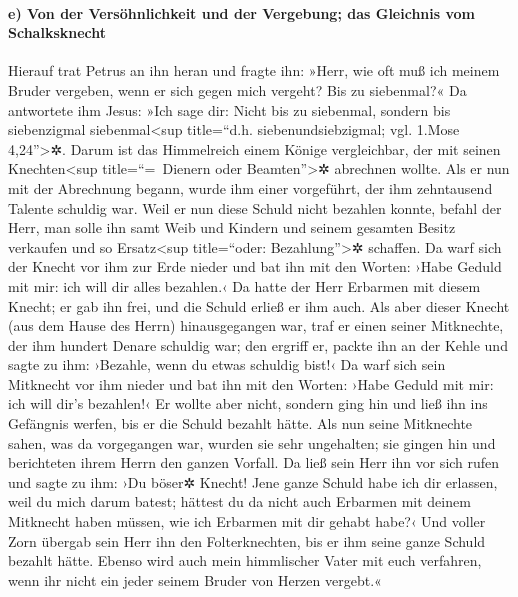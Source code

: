 \hypertarget{e-von-der-versuxf6hnlichkeit-und-der-vergebung-das-gleichnis-vom-schalksknecht}{%
\paragraph{e) Von der Versöhnlichkeit und der Vergebung; das Gleichnis
vom
Schalksknecht}\label{e-von-der-versuxf6hnlichkeit-und-der-vergebung-das-gleichnis-vom-schalksknecht}}

 Hierauf trat Petrus an ihn heran und fragte ihn: »Herr,
wie oft muß ich meinem Bruder vergeben, wenn er sich gegen mich vergeht?
Bis zu siebenmal?«  Da antwortete ihm Jesus: »Ich sage
dir: Nicht bis zu siebenmal, sondern bis siebenzigmal
siebenmal\textless sup title=``d.h. siebenundsiebzigmal; vgl. 1.Mose
4,24''\textgreater✲.  Darum ist das Himmelreich einem
Könige vergleichbar, der mit seinen Knechten\textless sup
title=``=~Dienern oder Beamten''\textgreater✲ abrechnen wollte.
 Als er nun mit der Abrechnung begann, wurde ihm einer
vorgeführt, der ihm zehntausend Talente schuldig war. 
Weil er nun diese Schuld nicht bezahlen konnte, befahl der Herr, man
solle ihn samt Weib und Kindern und seinem gesamten Besitz verkaufen und
so Ersatz\textless sup title=``oder: Bezahlung''\textgreater✲ schaffen.
 Da warf sich der Knecht vor ihm zur Erde nieder und bat
ihn mit den Worten: ›Habe Geduld mit mir: ich will dir alles bezahlen.‹
 Da hatte der Herr Erbarmen mit diesem Knecht; er gab ihn
frei, und die Schuld erließ er ihm auch.  Als aber dieser
Knecht (aus dem Hause des Herrn) hinausgegangen war, traf er einen
seiner Mitknechte, der ihm hundert Denare schuldig war; den ergriff er,
packte ihn an der Kehle und sagte zu ihm: ›Bezahle, wenn du etwas
schuldig bist!‹  Da warf sich sein Mitknecht vor ihm
nieder und bat ihn mit den Worten: ›Habe Geduld mit mir: ich will dir's
bezahlen!‹  Er wollte aber nicht, sondern ging hin und
ließ ihn ins Gefängnis werfen, bis er die Schuld bezahlt hätte.
 Als nun seine Mitknechte sahen, was da vorgegangen war,
wurden sie sehr ungehalten; sie gingen hin und berichteten ihrem Herrn
den ganzen Vorfall.  Da ließ sein Herr ihn vor sich rufen
und sagte zu ihm: ›Du böser✲ Knecht! Jene ganze Schuld habe ich dir
erlassen, weil du mich darum batest;  hättest du da nicht
auch Erbarmen mit deinem Mitknecht haben müssen, wie ich Erbarmen mit
dir gehabt habe?‹  Und voller Zorn übergab sein Herr ihn
den Folterknechten, bis er ihm seine ganze Schuld bezahlt hätte.
 Ebenso wird auch mein himmlischer Vater mit euch
verfahren, wenn ihr nicht ein jeder seinem Bruder von Herzen vergebt.«

